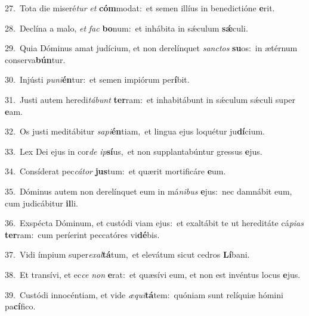 {\numbfont\textcolor{\numbcolor}{27.}}~Tota die miseré\textit{tur} \textit{et} \textbf{cóm}\-modat:~\star et semen illíus in benedictióne \textbf{e}\-rit.\par
{\numbfont\textcolor{\numbcolor}{28.}}~Declína a malo, \textit{et} \textit{fac} \textbf{bo}\-num:~\star et inhábita in sǽculum \textbf{sǽ}\-culi.\par
{\numbfont\textcolor{\numbcolor}{29.}}~Quia Dóminus amat judícium, et non derelínquet \textit{sanc}\-\textit{tos} \textbf{su}\-os:~\star in ætérnum conserva\-\textbf{bún}\-tur.\par
{\numbfont\textcolor{\numbcolor}{30.}}~Injústi \textit{pu}\-\textit{ni}\textbf{én}tur:~\star et semen impiórum per\-\textbf{í}\-bit.\par
{\numbfont\textcolor{\numbcolor}{31.}}~Justi autem heredi\-\textit{tá}\-\textit{bunt} \textbf{ter}\-ram:~\star et inhabitábunt in sǽculum sǽculi super \textbf{e}\-am.\par
{\numbfont\textcolor{\numbcolor}{32.}}~Os justi meditábitur \textit{sa}\-\textit{pi}\textbf{én}tiam,~\star et lingua ejus loquétur ju\-\textbf{dí}\-cium.\par
{\numbfont\textcolor{\numbcolor}{33.}}~Lex Dei ejus in cor\textit{de} \textit{ip}\-\textbf{sí}us,~\star et non supplantabúntur gressus \textbf{e}\-jus.\par
{\numbfont\textcolor{\numbcolor}{34.}}~Consíderat pec\-\textit{cá}\-\textit{tor} \textbf{jus}\-tum:~\star et quærit mortificáre \textbf{e}\-um.\par
{\numbfont\textcolor{\numbcolor}{35.}}~Dóminus autem non derelínquet eum in má\-\textit{ni}\-\textit{bus} \textbf{e}\-jus:~\star nec damnábit eum, cum judicábitur \textbf{il}\-li.\par
{\numbfont\textcolor{\numbcolor}{36.}}~Exspécta Dóminum, et custódi viam ejus:~\dagger et exaltábit te ut hereditáte cá\-\textit{pi}\-\textit{as} \textbf{ter}\-ram:~\star cum períerint peccatóres vi\-\textbf{dé}\-bis.\par
{\numbfont\textcolor{\numbcolor}{37.}}~Vidi ímpium super\-\textit{ex}\-\textit{al}\textbf{tá}tum,~\star et elevátum sicut cedros \textbf{Lí}\-bani.\par
{\numbfont\textcolor{\numbcolor}{38.}}~Et transívi, et ec\textit{ce} \textit{non} \textbf{e}\-rat:~\star et quæsívi eum, et non est invéntus locus \textbf{e}\-jus.\par
{\numbfont\textcolor{\numbcolor}{39.}}~Custódi innocéntiam, et vide \textit{æ}\-\textit{qui}\textbf{tá}tem:~\star quóniam sunt relíquiæ hómini pa\-\textbf{cí}\-fico.\par
